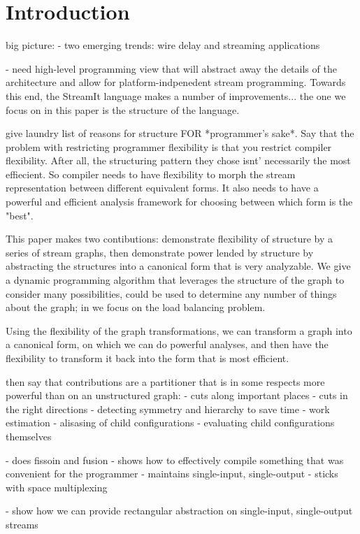 \section{Introduction}

big picture:  
- two emerging trends:  wire delay and streaming applications

  - need high-level programming view that will abstract away the
details of the architecture and allow for platform-indpenedent stream
programming.  Towards this end, the StreamIt language makes a number
of improvements... the one we focus on in this paper is the structure
of the language.

give laundry list of reasons for structure FOR *programmer's sake*.
Say that the problem with restricting programmer flexibility is that
you restrict compiler flexibility.  After all, the structuring pattern
they chose isnt' necessarily the most effiecient.  So compiler needs
to have flexibility to morph the stream representation between
different equivalent forms.  It also needs to have a powerful and
efficient analysis framework for choosing between which form is the
"best".

This paper makes two contibutions: demonstrate flexibility of
structure by a series of stream graphs, then demonstrate power lended
by structure by abstracting the structures into a canonical form that
is very analyzable.  We give a dynamic programming algorithm that
leverages the structure of the graph to consider many possibilities, 
 could be used to determine any number of things about the graph; in
we focus on the load balancing problem.

Using the flexibility of the graph transformations, we can transform a
graph into a canonical form, on which we can do powerful analyses, and
then have the flexibility to transform it back into the form that is
most efficient.

 then say that contributions are a partitioner that is in some
respects more powerful than on an unstructured graph:
  - cuts along important places
  - cuts in the right directions
  - detecting symmetry and hierarchy to save time
    - work estimation
    - alisasing of child configurations
    - evaluating child configurations themselves

- does fissoin and fusion
- shows how to effectively compile something that was convenient for the programmer
- maintains single-input, single-output
- sticks with space multiplexing

- show how we can provide rectangular abstraction on single-input, single-output streams

